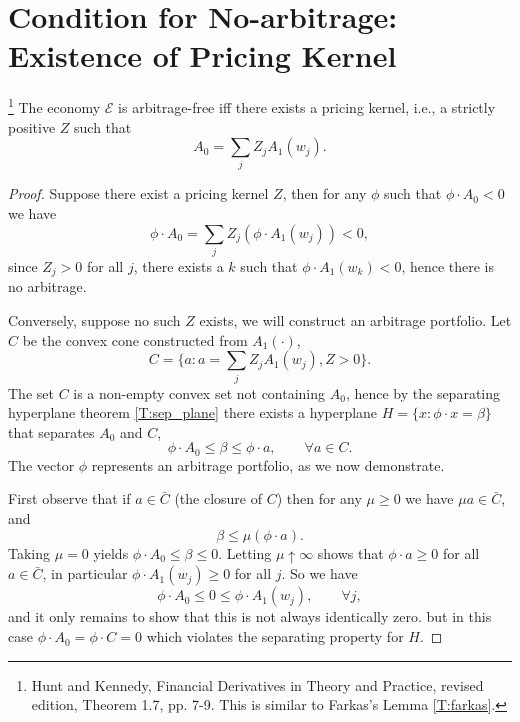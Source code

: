 \section{Condition for No-arbitrage: Existence of Pricing Kernel}

\begin{theorem} \label{T:no_arb}
\footnote{Hunt and Kennedy, Financial Derivatives in Theory and Practice, 
    revised edition, Theorem 1.7, pp. 7-9. This is similar to Farkas's 
    Lemma \ref{T:farkas}.}
The economy $\mathcal{E}$ is arbitrage-free iff there exists a pricing kernel,
i.e., a strictly positive $Z$ such that
\[
  A_0 = \sum_j Z_j A_1(w_j).
\]
\end{theorem}
\begin{proof} %
Suppose there exist a pricing kernel $Z$, then for any $\phi$ such that 
$\phi\cdot A_0<0$ we have
\[
  \phi\cdot A_0 = \sum_j Z_j (\phi\cdot A_1(w_j)) < 0,
\]
since $Z_j>0$ for all $j$, there exists a $k$ such that $\phi\cdot A_1(w_k)<0$,
hence there is no arbitrage.

Conversely, suppose no such $Z$ exists, we will construct an arbitrage
portfolio. Let $C$ be the convex cone constructed from $A_1(\cdot)$,
\[
  C = \{a: a=\sum_j Z_j A_1(w_j), Z>0  \}.
\]
The set $C$ is a non-empty convex set not containing $A_0$, hence by the
separating hyperplane theorem \ref{T:sep_plane}
there exists a hyperplane $H=\{x:\phi\cdot x=\beta\}$ that separates $A_0$ and
$C$,
\[
  \phi\cdot A_0 \leq \beta \leq \phi\cdot a, \qquad \forall a\in C.
\]
The vector $\phi$ represents an arbitrage portfolio, as we now demonstrate.

First observe that if $a\in\bar{C}$ (the closure of $C$) then for any 
$\mu\geq 0$ we have $\mu a\in\bar{C}$, and 
\[
  \beta\leq \mu(\phi\cdot a).
\]
Taking $\mu=0$ yields $\phi\cdot A_0\leq \beta\leq 0$. Letting
$\mu\uparrow\infty$ shows that $\phi\cdot a\geq 0$ for all $a\in \bar{C}$, in
particular $\phi\cdot A_1(w_j)\geq 0$ for all $j$. So we have
\[
  \phi\cdot A_0\leq 0 \leq \phi\cdot A_1(w_j), \qquad \forall j,
\]
and it only remains to show that this is not always identically zero. but in
this case $\phi\cdot A_0=\phi\cdot C=0$ which violates the separating property
for $H$.
\end{proof} %

